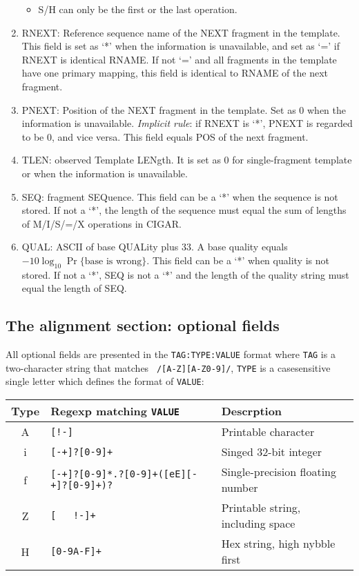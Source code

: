 \documentclass[10pt]{article}
\begin{document}
\begin{enumerate}
  \begin{itemize}
  \item S/H can only be the first or the last operation.
  \end{itemize}
\item {\sf RNEXT}: Reference sequence name of the NEXT fragment in the
  template. This field is set as `*' when the information is
  unavailable, and set as `=' if {\sf RNEXT} is identical {\sf
    RNAME}. If not `=' and all fragments in the template have one
  primary mapping, this field is identical to {\sf RNAME} of the next
  fragment.
\item {\sf PNEXT}: Position of the NEXT fragment in the template. Set as
  0 when the information is unavailable. \emph{Implicit rule}: if {\sf
    RNEXT} is `*', {\sf PNEXT} is regarded to be 0, and vice versa. This
  field equals {\sf POS} of the next fragment.
\item {\sf TLEN}: observed Template LENgth. It is set as 0 for
  single-fragment template or when the information is unavailable.
\item {\sf SEQ}: fragment SEQuence. This field can be a `*' when the
  sequence is not stored. If not a `*', the length of the sequence must
  equal the sum of lengths of M/I/S/=/X operations in {\sf CIGAR}.
\item {\sf QUAL}: ASCII of base QUALity plus 33. A base quality equals
  $-10\log_{10}\Pr\{\mbox{base is wrong}\}$. This field can be a `*'
  when quality is not stored. If not a `*', {\sf SEQ} is not a `*' and
  the length of the quality string must equal the length of {\sf SEQ}.
\end{enumerate}

\subsection{The alignment section: optional fields}
All optional fields are presented in the {\tt TAG:TYPE:VALUE} format
where {\tt TAG} is a two-character string that matches {\tt
  /[A-Z][A-Z0-9]/}, {\tt TYPE} is a casesensitive single letter which
defines the format of {\tt VALUE}:
\begin{center}\small
\begin{tabular}{cll}
\hline
{\bf Type} & {\bf Regexp matching {\tt VALUE}} & {\bf Descrption} \\
\hline
A & {\tt [!-\char126]} & Printable character \\
i & {\tt [-+]?[0-9]+} & Singed 32-bit integer \\
f & {\tt [-+]?[0-9]*\char92.?[0-9]+([eE][-+]?[0-9]+)?} & Single-precision floating number \\
Z & {\tt [\,\,\,!-\char126]+} & Printable string, including space\\
H & {\tt [0-9A-F]+} & Hex string, high nybble first \\
\hline
\end{tabular}
\end{center}
\end{document}
